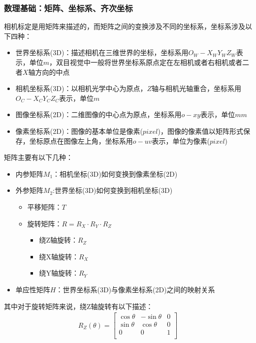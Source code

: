 \documentclass{article}
\begin{document}
\subsubsection{数理基础：矩阵、坐标系、齐次坐标}
相机标定是用矩阵来描述的，而矩阵之间的变换涉及不同的坐标系，坐标系涉及以下四种：
	\begin{itemize}
		\item 世界坐标系(3D)：描述相机在三维世界的坐标，坐标系用$O_{W} -X_{W} Y_{W} Z_{W} $表示，单位$m$，双目视觉中一般将世界坐标系原点定在左相机或者右相机或者二者$X$轴方向的中点
		\item 相机坐标系(3D)：以相机光学中心为原点，$Z$轴与相机光轴重合，坐标系用$O_{C} -X_{C} Y_{C} Z_{C} $表示，单位$m$
		\item 图像坐标系(2D)：二维图像的中心点为原点，坐标系用$o-xy$表示，单位$mm$
		\item 像素坐标系(2D)：图像的基本单位是像素($pixel$)，图像的像素值以矩阵形式保存，坐标原点在图像左上角，坐标系用$o-uv $表示，单位为像素($pixel$)
	\end{itemize}

矩阵主要有以下几种：
\begin{itemize}
		\item 内参矩阵$M_1$：相机坐标(3D)如何变换到像素坐标(2D)
		\item 外参矩阵$M_2$:世界坐标(3D)如何变换到相机坐标(3D)
	\begin{itemize}
		\item 平移矩阵：$T$
		\item 旋转矩阵：$R=R_X\cdot R_Y\cdot R_Z$
		\begin{itemize}
			\item 绕Z轴旋转：$R_Z$
			\item 绕X轴旋转：$R_X$
			\item 绕Y轴旋转：$R_Y$
		\end{itemize}
	\end{itemize}
	\item 单应性矩阵$H$：世界坐标系(3D)与像素坐标系(2D)之间的映射关系
	\end{itemize}

其中对于旋转矩阵来说，绕Z轴旋转有以下描述：
\begin{gather}
	R_Z\left( \theta \right) =\left[ \begin{matrix}
	\cos \theta&		-\sin \theta&		0\\
	\sin \theta&		\cos \theta&		0\\
	0&		0&		1\\
	\end{matrix} \right] 	
\end{gather}	
\end{document}
